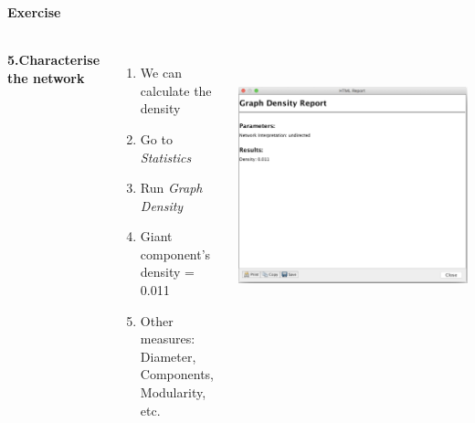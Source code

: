 \documentclass[8pt]{beamer}
\begin{document}
\begin{frame}
\begin{columns}
\end{columns}

\end{frame}


\begin{frame}
\frametitle{\insertsection}
\framesubtitle{Exercise}

\begin{columns}

\textbf{5.Characterise the network}
\begin{enumerate}
	\item We can calculate the density  
	\item Go to \textit{Statistics}
	\item Run \textit{Graph Density}
	\item Giant component's density = 0.011
	\item Other measures: Diameter, Components, Modularity, etc.
\end{enumerate}


\footnotesize
\centering
\includegraphics[height = 0.7\textwidth]{gephi_density.png}

\end{columns}

\end{frame}

\end{document}
